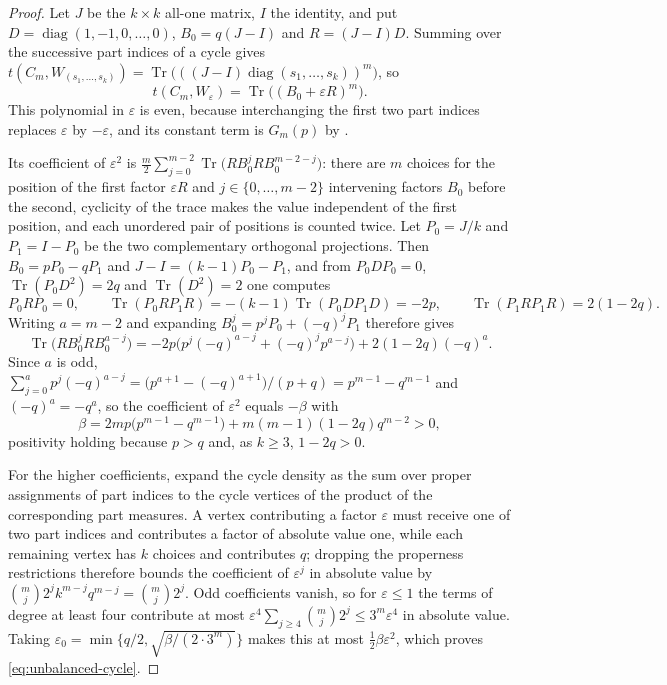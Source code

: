 \documentclass[11pt]{article}
\theoremstyle{remark}
\newcommand{\Tr}{\operatorname{Tr}}
\begin{document}
\begin{proof}
Let $J$ be the $k\times k$ all-one matrix, $I$ the identity, and put
$D=\operatorname{diag}(1,-1,0,\ldots,0)$, $B_0=q(J-I)$ and $R=(J-I)D$.
Summing over the successive part indices of a cycle gives
$t(C_m,W_{(s_1,\ldots,s_k)})
=\Tr\bigl(((J-I)\operatorname{diag}(s_1,\ldots,s_k))^m\bigr)$, so
\[
 t(C_m,W_\varepsilon)=\Tr\bigl((B_0+\varepsilon R)^m\bigr).
\]
This polynomial in $\varepsilon$ is even, because interchanging the first
two part indices replaces $\varepsilon$ by $-\varepsilon$, and its
constant term is $G_m(p)$ by \cite[Eq.~(1.1)]{kim2026goodman}.

Its coefficient of $\varepsilon^2$ is
$\tfrac m2\sum_{j=0}^{m-2}\Tr\bigl(RB_0^jRB_0^{m-2-j}\bigr)$: there are
$m$ choices for the position of the first factor $\varepsilon R$ and
$j\in\{0,\ldots,m-2\}$ intervening factors $B_0$ before the second,
cyclicity of the trace makes the value independent of the first position,
and each unordered pair of positions is counted twice. Let
$P_0=J/k$ and $P_1=I-P_0$ be the two complementary orthogonal
projections. Then $B_0=pP_0-qP_1$ and $J-I=(k-1)P_0-P_1$, and from
$P_0DP_0=0$, $\Tr(P_0D^2)=2q$ and $\Tr(D^2)=2$ one computes
\[
 P_0RP_0=0,\qquad
 \Tr(P_0RP_1R)=-(k-1)\Tr(P_0DP_1D)=-2p,\qquad
 \Tr(P_1RP_1R)=2(1-2q).
\]
Writing $a=m-2$ and expanding $B_0^j=p^jP_0+(-q)^jP_1$ therefore gives
\[
 \Tr\bigl(RB_0^jRB_0^{a-j}\bigr)
 =-2p\bigl(p^j(-q)^{a-j}+(-q)^jp^{a-j}\bigr)+2(1-2q)(-q)^a .
\]
Since $a$ is odd, $\sum_{j=0}^ap^j(-q)^{a-j}
=\bigl(p^{a+1}-(-q)^{a+1}\bigr)/(p+q)=p^{m-1}-q^{m-1}$ and
$(-q)^a=-q^a$, so the coefficient of $\varepsilon^2$ equals $-\beta$ with
\[
 \beta=2mp\bigl(p^{m-1}-q^{m-1}\bigr)+m(m-1)(1-2q)q^{m-2}>0,
\]
positivity holding because $p>q$ and, as $k\geq3$, $1-2q>0$.

For the higher coefficients, expand the cycle density as the sum over
proper assignments of part indices to the cycle vertices of the product
of the corresponding part measures. A vertex contributing a factor
$\varepsilon$ must receive one of two part indices and contributes a
factor of absolute value one, while each remaining vertex has $k$ choices
and contributes $q$; dropping the properness restrictions therefore
bounds the coefficient of $\varepsilon^j$ in absolute value by
$\binom mj2^jk^{m-j}q^{m-j}=\binom mj2^j$. Odd coefficients vanish, so for
$\varepsilon\leq1$ the terms of degree at least four contribute at most
$\varepsilon^4\sum_{j\geq4}\binom mj2^j\leq3^m\varepsilon^4$ in absolute
value. Taking
$\varepsilon_0=\min\{q/2,\sqrt{\beta/(2\cdot3^m)}\}$ makes this at most
$\tfrac12\beta\varepsilon^2$, which proves
\eqref{eq:unbalanced-cycle}.
\end{proof}
\end{document}
